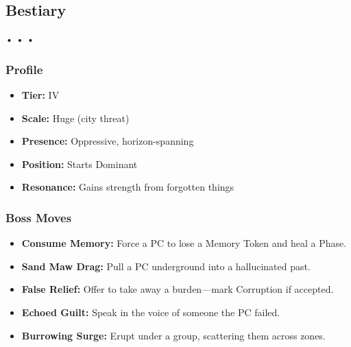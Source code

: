 \documentclass[11pt]{article}
\begin{document}
\subsection{Bestiary}

\begin{creature}
     •  •  • 
    
    
    
    \subsubsection*{Profile}
    \begin{itemize}
      \item \textbf{Tier:} IV
      \item \textbf{Scale:} Huge (city threat)
      \item \textbf{Presence:} Oppressive, horizon-spanning
      \item \textbf{Position:} Starts Dominant
      \item \textbf{Resonance:} Gains strength from forgotten things
    \end{itemize}
    
    \vspace{6pt}
    
    \subsubsection*{Boss Moves}
    \begin{itemize}
      \item \textbf{Consume Memory:} Force a PC to lose a Memory Token and heal a Phase.
      \item \textbf{Sand Maw Drag:} Pull a PC underground into a hallucinated past.
      \item \textbf{False Relief:} Offer to take away a burden---mark Corruption if accepted.
      \item \textbf{Echoed Guilt:} Speak in the voice of someone the PC failed.
      \item \textbf{Burrowing Surge:} Erupt under a group, scattering them across zones.
    \end{itemize}
    

\end{creature}
\end{document}
